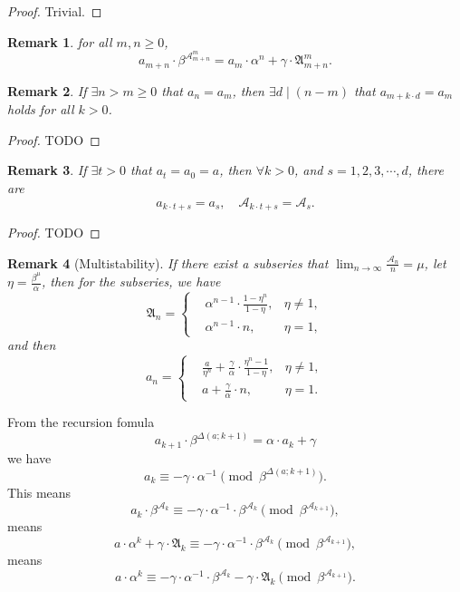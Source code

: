\documentclass[a4paper,11pt]{article}
\theoremstyle{sltheorem}
\newtheorem*{remark}{Remark}
\newcommand{\CollatzReduce}[2]{\Delta({#1};{#2})}
\begin{document}
\begin{proof} Trivial. \end{proof}
\begin{remark}
for all $m,n \ge 0$, 
\[ a_{m+n} \cdot \beta^{\mathcal{A}_{m+n}^{m}} = a_m\cdot\alpha^n + \gamma\cdot\mathfrak{A}_{m + n}^{m}. \]
\end{remark}
\begin{remark}
    If $\exists n > m \ge 0$ that $a_n = a_m$, 
    then $\exists d \mid (n - m)$ that $a_{m + k \cdot d} = a_{m}$ holds for all $k > 0$.
\end{remark}
\begin{proof} TODO \end{proof}
\begin{remark}
    If $\exists t > 0$ that $a_{t} = a_0 = a$, 
    then $\forall k > 0$, and $s = 1, 2, 3, \cdots, d$, there are
    \[a_{k\cdot t+s} = a_s,\quad \mathcal{A}_{k\cdot t + s} = \mathcal{A}_{s}.\]
\end{remark}
\begin{proof} TODO \end{proof}
\begin{remark}[Multistability]\label{remark:multistability}
	If there exist a subseries that $\lim_{n\to\infty} \frac{\mathcal{A}_n}{n} = \mu$, let $\eta = \frac{\beta^\mu}{\alpha}$, then for the subseries, we have
    \[\mathfrak{A}_n = \left\{\begin{aligned}
    & \alpha^{n - 1} \cdot \frac{1 - \eta^n}{1 - \eta}, &\eta \ne 1, \\
    & \alpha^{n-1} \cdot n, &\eta = 1,
    \end{aligned}\right.\]
    and then
	\[a_n = \left\{\begin{aligned}
	& \frac{a}{\eta^n} + \frac{\gamma}{\alpha} \cdot \frac{\eta^n - 1}{1 - \eta}, &\eta \ne 1, \\
	& a + \frac{\gamma}{\alpha}\cdot n, &\eta = 1.
	\end{aligned}\right.\]
\end{remark}
\newpage
From the recursion fomula
\[ a_{k+1} \cdot \beta^{\CollatzReduce{a}{k + 1}} = \alpha \cdot a_{k} + \gamma \]
we have
\[ a_k \equiv - \gamma \cdot \alpha^{-1} \pmod{\beta^{\CollatzReduce{a}{k + 1}}}. \]
This means
\[ a_k \cdot \beta^{\mathcal{A}_{k}} \equiv - \gamma \cdot \alpha^{-1} \cdot \beta^{\mathcal{A}_{k}} \pmod{\beta^{\mathcal{A}_{k+1}}}, \]
means
\[a \cdot\alpha^k + \gamma\cdot\mathfrak{A}_k \equiv - \gamma \cdot \alpha^{-1} \cdot \beta^{\mathcal{A}_{k}} \pmod{\beta^{\mathcal{A}_{k+1}}}, \]
means
\[a \cdot\alpha^k \equiv - \gamma \cdot \alpha^{-1} \cdot \beta^{\mathcal{A}_{k}} - \gamma\cdot\mathfrak{A}_k \pmod{\beta^{\mathcal{A}_{k+1}}}. \]
\end{document}
